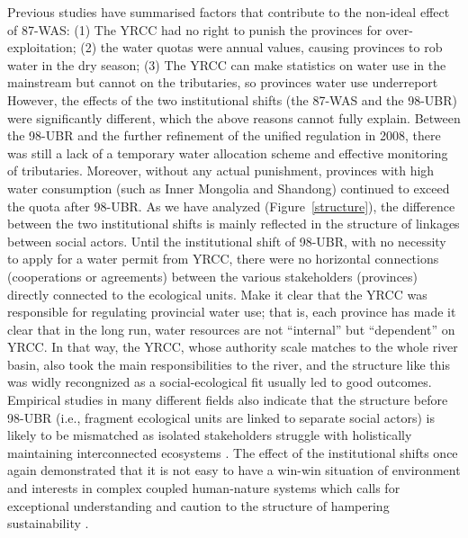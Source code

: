 Previous studies have summarised factors that contribute to the non-ideal effect of 87-WAS: (1) The YRCC had no right to punish the provinces for over-exploitation; (2) the water quotas were annual values, causing provinces to rob water in the dry season; (3) The YRCC can make statistics on water use in the mainstream but cannot on the tributaries, so provinces water use underreport %
However, the effects of the two institutional shifts (the 87-WAS and the 98-UBR) were significantly different, which the above reasons cannot fully explain.
Between the 98-UBR and the further refinement of the unified regulation in 2008, there was still a lack of a temporary water allocation scheme and effective monitoring of tributaries.
Moreover, without any actual punishment, provinces with high water consumption (such as Inner Mongolia and Shandong) continued to exceed the quota after 98-UBR.
As we have analyzed (Figure~\ref{structure}), the difference between the two institutional shifts is mainly reflected in the structure of linkages between social actors.
Until the institutional shift of 98-UBR, with no necessity to apply for a water permit from YRCC, there were no horizontal connections (cooperations or agreements) between the various stakeholders (provinces) directly connected to the ecological units.
Make it clear that the YRCC was responsible for regulating provincial water use; that is, each province has made it clear that in the long run, water resources are not ``internal'' but ``dependent'' on YRCC.
In that way, the YRCC, whose authority scale matches to the whole river basin, also took the main responsibilities to the river, and the structure like this was widly recongnized as a social-ecological fit usually led to good outcomes.
Empirical studies in many different fields also indicate that the structure before 98-UBR (i.e., fragment ecological units are linked to separate social actors) is likely to be mismatched as isolated stakeholders struggle with holistically maintaining interconnected ecosystems
\cite{sayles2017,sayles2019,cai2016,bergsten2019}.
The effect of the institutional shifts once again demonstrated that it is not easy to have a win-win situation of environment and interests in complex coupled human-nature systems \cite{hegwood2022} which calls for exceptional understanding and caution to the structure of hampering sustainability \cite{bergsten2019, sayles2019}.
